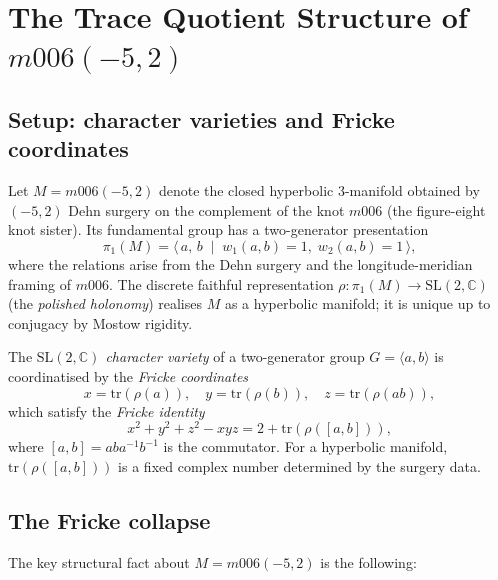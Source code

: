 
\section{The Trace Quotient Structure of \texorpdfstring{$m006(-5,2)$}{m006(-5,2)}}
\label{sec:trace-quotient}

\subsection{Setup: character varieties and Fricke coordinates}
\label{subsec:char-var-setup}

Let $M = m006(-5,2)$ denote the closed hyperbolic 3-manifold obtained
by $(-5,2)$ Dehn surgery on the complement of the knot $m006$ (the
figure-eight knot sister). Its fundamental group has a two-generator
presentation
\[
  \pi_1(M) = \langle\, a,\, b \;\mid\; w_1(a,b) = 1, \; w_2(a,b) = 1 \,\rangle,
\]
where the relations arise from the Dehn surgery and the longitude-meridian
framing of $m006$. The discrete faithful representation
$\rho\colon \pi_1(M) \to \mathrm{SL}(2,\mathbb{C})$
(the \emph{polished holonomy}) realises $M$ as a hyperbolic manifold;
it is unique up to conjugacy by Mostow rigidity.

The \emph{$\mathrm{SL}(2,\mathbb{C})$ character variety} of a
two-generator group $G = \langle a, b \rangle$ is coordinatised by the
\emph{Fricke coordinates}
\[
  x = \mathrm{tr}(\rho(a)), \quad
  y = \mathrm{tr}(\rho(b)), \quad
  z = \mathrm{tr}(\rho(ab)),
\]
which satisfy the \emph{Fricke identity}
\begin{equation}
\label{eq:fricke}
  x^2 + y^2 + z^2 - xyz = 2 + \mathrm{tr}(\rho([a,b])),
\end{equation}
where $[a,b] = aba^{-1}b^{-1}$ is the commutator.
For a hyperbolic manifold, $\mathrm{tr}(\rho([a,b]))$ is a fixed complex
number determined by the surgery data.

\subsection{The Fricke collapse}
\label{subsec:fricke-collapse}

The key structural fact about $M = m006(-5,2)$ is the following:

